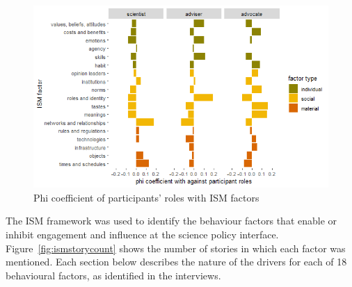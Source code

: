 \begin{figure}[!ht]
    \centering
    \includegraphics[width=1\linewidth]{figures/phi_coefficient_with_roles.png}
    \caption{Phi coefficient of participants' roles with ISM factors}
    \label{fig:ismparticipantcount}
\end{figure}




The ISM framework was used to identify the behaviour factors that enable or inhibit engagement and influence at the science policy interface. Figure~\ref{fig:ismstorycount} shows the number of stories in which each factor was mentioned. Each section below describes the nature of the drivers for each of 18 behavioural factors, as identified in the interviews.

